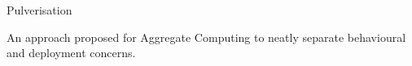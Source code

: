 \begin{frame}{Pulverisation~\cite{DBLP:journals/fi/CasadeiPPVW20}}
  \begin{cardTiny}
    {
      \color{accent} An approach proposed for Aggregate Computing 
      to neatly separate behavioural and deployment concerns. 
    }
  \end{cardTiny}
  \begin{columns}
    \begin{column}{0.45\textwidth}
    \end{column}
    \begin{column}{0.38\textwidth}
    \end{column}
  \end{columns}
\end{frame}